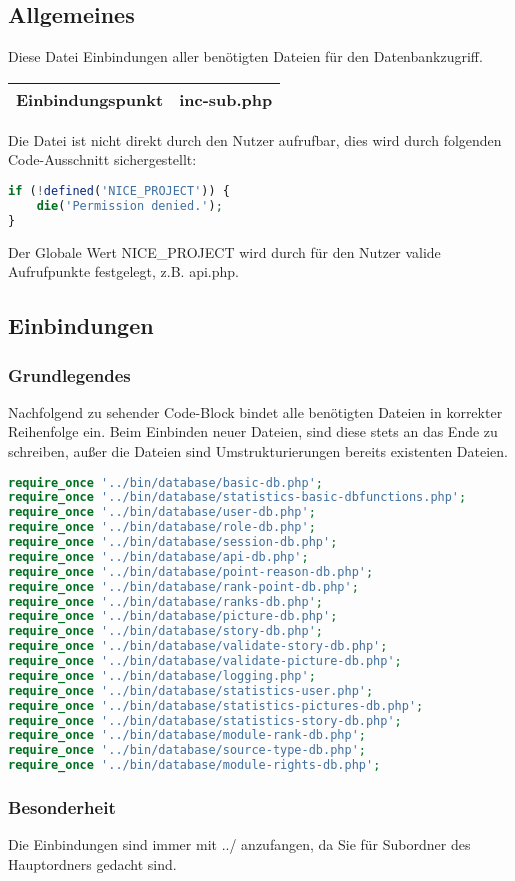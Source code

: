 \subsection{Allgemeines} Diese Datei Einbindungen aller benötigten Dateien für den Datenbankzugriff.
\begin{table}[H]
	\begin{tabular}{|c|p{11cm}|}
		\hline
		\textbf{Einbindungspunkt} & inc-sub.php \\ \hline
	\end{tabular}
\end{table}
Die Datei ist nicht direkt durch den Nutzer aufrufbar, dies wird durch folgenden Code-Ausschnitt sichergestellt:
\begin{lstlisting}[language=php]
if (!defined('NICE_PROJECT')) {
	die('Permission denied.');
}
\end{lstlisting}
Der Globale Wert {\glqq NICE\_PROJECT\grqq} wird durch für den Nutzer valide Aufrufpunkte festgelegt, z.B. {\glqq api.php\grqq}.
\newpage
\subsection{Einbindungen}
\subsubsection{Grundlegendes}
Nachfolgend zu sehender Code-Block bindet alle benötigten Dateien in korrekter Reihenfolge ein. Beim Einbinden neuer Dateien, sind diese stets an das Ende zu schreiben, außer die Dateien sind Umstrukturierungen bereits existenten Dateien.
\begin{lstlisting}[language=php]
require_once '../bin/database/basic-db.php';
require_once '../bin/database/statistics-basic-dbfunctions.php';
require_once '../bin/database/user-db.php';
require_once '../bin/database/role-db.php';
require_once '../bin/database/session-db.php';
require_once '../bin/database/api-db.php';
require_once '../bin/database/point-reason-db.php';
require_once '../bin/database/rank-point-db.php';
require_once '../bin/database/ranks-db.php';
require_once '../bin/database/picture-db.php';
require_once '../bin/database/story-db.php';
require_once '../bin/database/validate-story-db.php';
require_once '../bin/database/validate-picture-db.php';
require_once '../bin/database/logging.php';
require_once '../bin/database/statistics-user.php';
require_once '../bin/database/statistics-pictures-db.php';
require_once '../bin/database/statistics-story-db.php';
require_once '../bin/database/module-rank-db.php';
require_once '../bin/database/source-type-db.php';
require_once '../bin/database/module-rights-db.php';
\end{lstlisting}
\subsubsection{Besonderheit}
Die Einbindungen sind immer mit {\glqq ../\grqq} anzufangen, da Sie für Subordner des Hauptordners gedacht sind.
